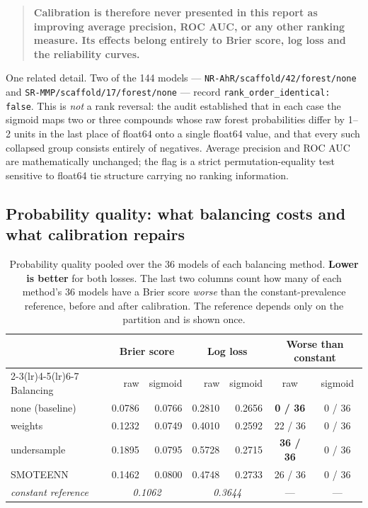 \documentclass[10pt,letterpaper]{article}
\begin{document}
\begin{quote}
\textbf{Calibration is therefore never presented in this report as improving average precision, ROC
AUC, or any other ranking measure. Its effects belong entirely to Brier score, log loss and the
reliability curves.}
\end{quote}

One related detail. Two of the 144 models --- \texttt{NR-AhR/scaffold/42/forest/none} and
\texttt{SR-MMP/scaffold/17/forest/none} --- record \texttt{rank\_order\_identical: false}. This is
\emph{not} a rank reversal: the audit established that in each case the sigmoid maps two or three
compounds whose raw forest probabilities differ by 1--2 units in the last place of float64 onto a
single float64 value, and that every such collapsed group consists entirely of negatives. Average
precision and ROC AUC are mathematically unchanged; the flag is a strict permutation-equality test
sensitive to float64 tie structure carrying no ranking information.

\subsection{Probability quality: what balancing costs and what calibration repairs}
\label{sec:prob}

\begin{table}[!htbp]
\centering
\small
\caption{Probability quality pooled over the 36 models of each balancing method. \textbf{Lower is
better} for both losses. The last two columns count how many of each method's 36 models have a Brier
score \emph{worse} than the constant-prevalence reference, before and after calibration. The
reference depends only on the partition and is shown once.}
\label{tab:prob}
\begin{tabular}{@{}lrrrrcc@{}}
\toprule
 & \multicolumn{2}{c}{Brier score} & \multicolumn{2}{c}{Log loss} & \multicolumn{2}{c}{Worse than constant} \\
\cmidrule(lr){2-3}\cmidrule(lr){4-5}\cmidrule(lr){6-7}
Balancing & raw & sigmoid & raw & sigmoid & raw & sigmoid \\
\midrule
none (baseline) & 0.0786 & 0.0766 & 0.2810 & 0.2656 & \textbf{0 / 36} & 0 / 36 \\
weights         & 0.1232 & 0.0749 & 0.4010 & 0.2592 & 22 / 36 & 0 / 36 \\
undersample     & 0.1895 & 0.0795 & 0.5728 & 0.2715 & \textbf{36 / 36} & 0 / 36 \\
SMOTEENN        & 0.1462 & 0.0800 & 0.4748 & 0.2733 & 26 / 36 & 0 / 36 \\
\midrule
\textit{constant reference} & \multicolumn{2}{c}{\textit{0.1062}} & \multicolumn{2}{c}{\textit{0.3644}} & --- & --- \\
\bottomrule
\end{tabular}
\end{table}
\end{document}
